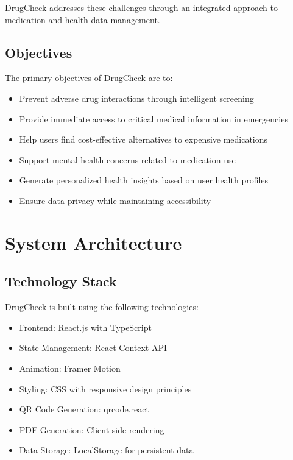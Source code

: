 \documentclass[12pt,a4paper]{report}
\begin{document}
DrugCheck addresses these challenges through an integrated approach to medication and health data management.

\section{Objectives}
The primary objectives of DrugCheck are to:
\begin{itemize}
    \item Prevent adverse drug interactions through intelligent screening
    \item Provide immediate access to critical medical information in emergencies
    \item Help users find cost-effective alternatives to expensive medications
    \item Support mental health concerns related to medication use
    \item Generate personalized health insights based on user health profiles
    \item Ensure data privacy while maintaining accessibility
\end{itemize}

\chapter{System Architecture}

\section{Technology Stack}
DrugCheck is built using the following technologies:
\begin{itemize}
    \item Frontend: React.js with TypeScript
    \item State Management: React Context API
    \item Animation: Framer Motion
    \item Styling: CSS with responsive design principles
    \item QR Code Generation: qrcode.react
    \item PDF Generation: Client-side rendering
    \item Data Storage: LocalStorage for persistent data
\end{itemize}
\end{document}
